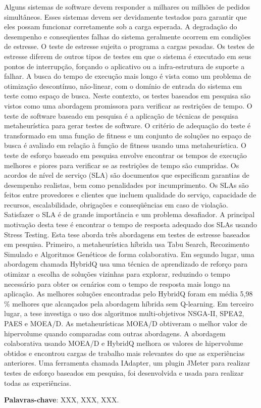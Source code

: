 
\begin{resumo} 
 
Alguns sistemas de software devem responder a milhares ou milhões de pedidos simultâneos.
Esses sistemas devem ser devidamente testados para garantir que eles possam funcionar corretamente sob a carga esperada. A degradação do desempenho e conseqüentes falhas do sistema geralmente ocorrem em condições de estresse. O teste de estresse sujeita o programa a cargas pesadas. Os testes de estresse diferem de outros tipos de testes em que o sistema é executado em seus pontos de interrupção, forçando o aplicativo ou a infra-estrutura de suporte a falhar. A busca do tempo de execução mais longo é vista como um problema de otimização descontínuo, não-linear, com o domínio de entrada do sistema em teste como espaço de busca. Neste contexto, os testes baseados em pesquisa são vistos como uma abordagem promissora para verificar as restrições de tempo. O teste de software baseado em pesquisa é a aplicação de técnicas de pesquisa metaheurística para gerar testes de software. O critério de adequação do teste é transformado em uma função de fitness e um conjunto de soluções no espaço de busca é avaliado em relação à função de fitness usando uma metaheurística. O teste de esforço baseado em pesquisa envolve encontrar os tempos de execução melhores e piores para verificar se as restrições de tempo são cumpridas. Os acordos de nível de serviço (SLA) são documentos que especificam garantias de desempenho realistas, bem como penalidades por incumprimento. Os SLAs são feitos entre provedores e clientes que incluem qualidade do serviço, capacidade de recursos, escalabilidade, obrigações e conseqüências em caso de violação. Satisfazer o SLA é de grande importância e um problema desafiador. A principal motivação desta tese é encontrar o tempo de resposta adequado dos SLAs usando Stress Testing. Esta tese aborda três abordagens em testes de estresse baseados em pesquisa. Primeiro, a metaheurística híbrida usa Tabu Search, Recozimento Simulado e Algoritmos Genéticos de forma colaborativa. Em segundo lugar, uma abordagem chamada HybridQ usa uma técnica de aprendizado de reforço para otimizar a escolha de soluções vizinhas para explorar, reduzindo o tempo necessário para obter os cenários com o tempo de resposta mais longo na aplicação. As melhores soluções encontradas pelo HybridQ foram em média 5,98 \% melhores que alcançados pela abordagem híbrida sem Q-learning. Em terceiro lugar, a tese investiga o uso dos algoritmos multi-objetivos NSGA-II, SPEA2, PAES e MOEA/D. As metaheurísticas MOEA/D obtiveram o melhor valor de hipervolume quando comparadas com outras abordagens. A abordagem colaborativa usando MOEA/D e HybridQ melhora os valores de hipervolume obtidos e encontrou cargas de trabalho mais relevantes do que as experiências anteriores. Uma ferramenta chamada IAdapter, um plugin JMeter para realizar testes de esforço baseados em pesquisa, foi desenvolvida e usada para realizar todas as experiências.

\textbf{Palavras-chave}: XXX, XXX, XXX.

\end{resumo}

